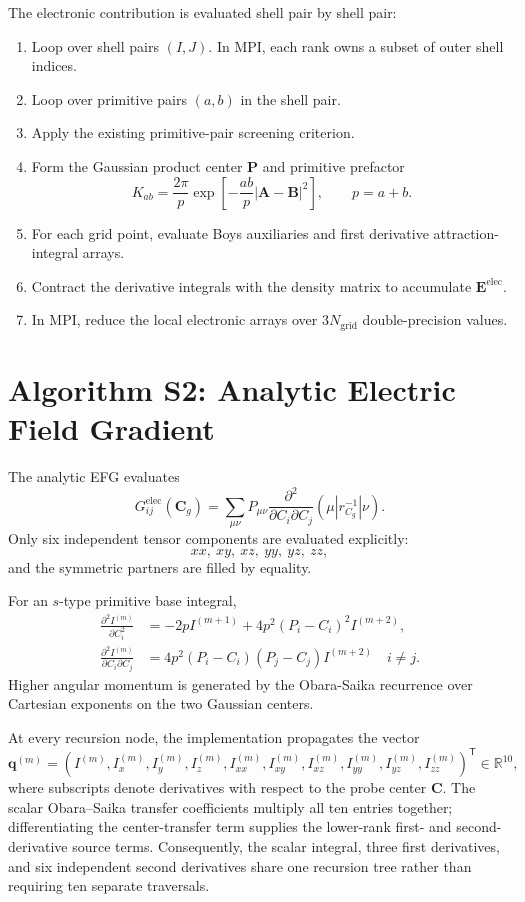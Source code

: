\documentclass[journal=jcisd8,manuscript=suppinfo]{achemso}
\begin{document}
The electronic contribution is evaluated shell pair by shell pair:
\begin{enumerate}
  \item Loop over shell pairs \((I,J)\).  In MPI, each rank owns a subset of outer shell indices.
  \item Loop over primitive pairs \((a,b)\) in the shell pair.
  \item Apply the existing primitive-pair screening criterion.
  \item Form the Gaussian product center \(\mathbf{P}\) and primitive prefactor
  \[
    K_{ab}=\frac{2\pi}{p}\exp\left[-\frac{ab}{p}|\mathbf{A}-\mathbf{B}|^2\right],
    \qquad p=a+b.
  \]
  \item For each grid point, evaluate Boys auxiliaries and first derivative attraction-integral arrays.
  \item Contract the derivative integrals with the density matrix to accumulate \(\mathbf{E}^{\mathrm{elec}}\).
  \item In MPI, reduce the local electronic arrays over \(3N_{\mathrm{grid}}\) double-precision values.
\end{enumerate}

\section{Algorithm S2: Analytic Electric Field Gradient}

The analytic EFG evaluates
\begin{equation}
  G_{ij}^{\mathrm{elec}}(\mathbf{C}_g)
  =
  \sum_{\mu\nu}P_{\mu\nu}
  \frac{\partial^2}{\partial C_i\partial C_j}
  (\mu|r_{C_g}^{-1}|\nu).
\end{equation}
Only six independent tensor components are evaluated explicitly:
\[
  xx,\ xy,\ xz,\ yy,\ yz,\ zz,
\]
and the symmetric partners are filled by equality.

For an \(s\)-type primitive base integral,
\begin{align}
  \frac{\partial^2 I^{(m)}}{\partial C_i^2}
  &=
  -2p I^{(m+1)}
  +
  4p^2(P_i-C_i)^2 I^{(m+2)},\\
  \frac{\partial^2 I^{(m)}}{\partial C_i\partial C_j}
  &=
  4p^2(P_i-C_i)(P_j-C_j)I^{(m+2)}
  \quad i\ne j.
\end{align}
Higher angular momentum is generated by the Obara-Saika recurrence over Cartesian exponents on the two Gaussian centers.

At every recursion node, the implementation propagates the vector
\begin{equation}
  \mathbf{q}^{(m)}=
  \left(
  I^{(m)},I_x^{(m)},I_y^{(m)},I_z^{(m)},
  I_{xx}^{(m)},I_{xy}^{(m)},I_{xz}^{(m)},
  I_{yy}^{(m)},I_{yz}^{(m)},I_{zz}^{(m)}
  \right)^{\mathsf T}\in\mathbb{R}^{10},
\end{equation}
where subscripts denote derivatives with respect to the probe center
\(\mathbf{C}\).  The scalar Obara--Saika transfer coefficients multiply all
ten entries together; differentiating the center-transfer term supplies the
lower-rank first- and second-derivative source terms.  Consequently, the
scalar integral, three first derivatives, and six independent second
derivatives share one recursion tree rather than requiring ten separate
traversals.
\end{document}
